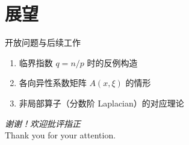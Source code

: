 \documentclass[UTF8,10pt]{beamer}
\begin{document}
\section{展望}
\begin{frame}{开放问题与后续工作}
\begin{enumerate}
  \item 临界指数 $q=n/p$ 时的反例构造
  \item 各向异性系数矩阵 $A(x,\xi)$ 的情形
  \item 非局部算子（分数阶 Laplacian）的对应理论
\end{enumerate}

\vspace{1em}
\begin{center}
\Large\emph{谢谢！欢迎批评指正}\\[4pt]
\normalsize Thank you for your attention.
\end{center}
\end{frame}
\end{document}
